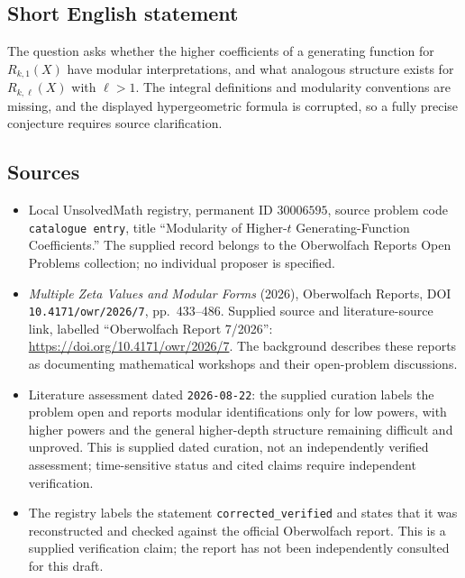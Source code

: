 \documentclass[11pt]{article}
\begin{document}
\subsection{Short English statement}
The question asks whether the higher coefficients of a generating function for \(R_{k,1}(X)\) have modular interpretations, and what analogous structure exists for \(R_{k,\ell}(X)\) with \(\ell>1\). The integral definitions and modularity conventions are missing, and the displayed hypergeometric formula is corrupted, so a fully precise conjecture requires source clarification.
\subsection{Sources}
\begin{itemize}
\item Local UnsolvedMath registry, permanent ID \(30006595\), source problem code \texttt{catalogue entry}, title ``Modularity of Higher-\(t\) Generating-Function Coefficients.'' The supplied record belongs to the Oberwolfach Reports Open Problems collection; no individual proposer is specified.
\item \emph{Multiple Zeta Values and Modular Forms} (2026), Oberwolfach Reports, DOI \texttt{10.4171/owr/2026/7}, pp.\ 433--486. Supplied source and literature-source link, labelled ``Oberwolfach Report 7/2026'': \url{https://doi.org/10.4171/owr/2026/7}. The background describes these reports as documenting mathematical workshops and their open-problem discussions.
\item Literature assessment dated \texttt{2026-08-22}: the supplied curation labels the problem open and reports modular identifications only for low powers, with higher powers and the general higher-depth structure remaining difficult and unproved. This is supplied dated curation, not an independently verified assessment; time-sensitive status and cited claims require independent verification.
\item The registry labels the statement \texttt{corrected\_verified} and states that it was reconstructed and checked against the official Oberwolfach report. This is a supplied verification claim; the report has not been independently consulted for this draft.
\end{itemize}
\end{document}
